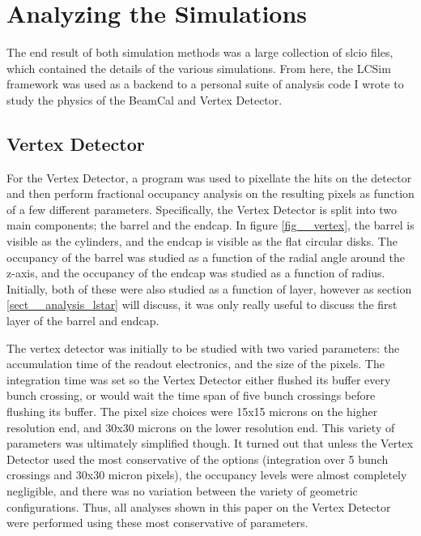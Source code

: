 \documentclass{report}
\begin{document}
    \chapter{Analyzing the Simulations}
        The end result of both simulation methods was a large collection of slcio files, which contained the details of the various simulations. From here, the LCSim framework was used as a backend to a personal suite of analysis code I wrote to study the physics of the BeamCal and Vertex Detector.
            
        \section{Vertex Detector} \label{sect__analysis_vertex}
            For the Vertex Detector, a program was used to pixellate the hits on the detector and then perform fractional occupancy analysis on the resulting pixels as function of a few different parameters. Specifically, the Vertex Detector is split into two main components; the barrel and the endcap. In figure \ref{fig__vertex}, the barrel is visible as the cylinders, and the endcap is visible as the flat circular disks. The occupancy of the barrel was studied as a function of the radial angle around the z-axis, and the occupancy of the endcap was studied as a function of radius. Initially, both of these were also studied as a function of layer, however as section \ref{sect__analysis_lstar} will discuss, it was only really useful to discuss the first layer of the barrel and endcap.

            The vertex detector was initially to be studied with two varied parameters: the accumulation time of the readout electronics, and the size of the pixels. The integration time was set so the Vertex Detector either flushed its buffer every bunch crossing, or would wait the time span of five bunch crossings before flushing its buffer. The pixel size choices were 15x15 microns on the higher resolution end, and 30x30 microns on the lower resolution end. This variety of parameters was ultimately simplified though. It turned out that unless the Vertex Detector used the most conservative of the options (integration over 5 bunch crossings and 30x30 micron pixels), the occupancy levels were almost completely negligible, and there was no variation between the variety of geometric configurations. Thus, all analyses shown in this paper on the Vertex Detector were performed using these most conservative of parameters.
\end{document}
